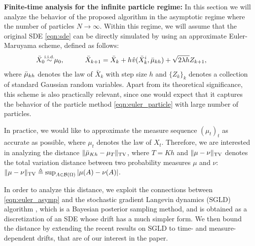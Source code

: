 
\textbf{Finite-time analysis for the infinite particle regime: }
%
In this section we will analyze the behavior of the proposed algorithm in the asymptotic regime where the number of particles $N \rightarrow \infty$. Within this regime, we will assume that the original SDE \eqref{eqn:sde} can be directly simulated by using an approximate Euler-Maruyama scheme, defined as follows:
\begin{align}
\bar{X}_0 \simiid \mu_0, \quad \qquad \bar{X}_{k+1} = \bar{X}_k + h \hspace{0.5pt} \hat{v}(\bar{X}^i_k, \bar{\mu}_{kh} ) + \sqrt{2 \lambda h} Z_{k+1}, \qquad \label{eqn:euler_asymp}
\end{align}
where $\bar{\mu}_{kh}$ denotes the law of $\bar{X}_k$ with step size $h$ and $\{Z_k\}_{k}$ denotes a collection of standard Gaussian random variables. Apart from its theoretical significance, this scheme is also practically relevant, since one would expect that it captures the behavior of the particle method \eqref{eqn:euler_particle} with large number of particles. 

In practice, we would like to approximate the measure sequence $(\mu_t)_t$ as accurate as possible, where $\mu_t$ denotes the law of $X_t$. Therefore, we are interested in analyzing the distance $\| \bar{\mu}_{Kh} - \mu_{T} \|_{\textnormal{TV}}$, where $T=Kh$ and $\|\mu-\nu\|_{\textnormal{TV}}$ denotes the total variation distance between two probability measures $\mu$ and $\nu$: $\|\mu-\nu\|_{\textnormal{TV}}\triangleq \sup_{A \in {\cal B}(\Omega)} |\mu(A) -\nu(A) |$. 
%

In order to analyze this distance, we exploit the connections between \eqref{eqn:euler_asymp} and the stochastic gradient Langevin dynamics (SGLD) algorithm \cite{WelTeh2011a}, which is a Bayesian posterior sampling method, and is obtained as a discretization of an SDE whose drift has a much simpler form. We then bound the distance by extending the recent results on SGLD \cite{raginsky17a} to time- and measure-dependent drifts, that are of our interest in the paper.

